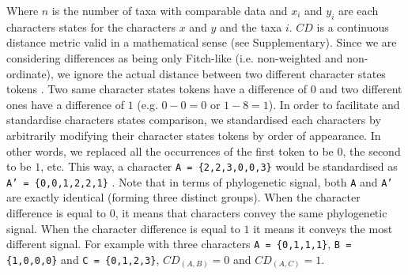 \documentclass[12pt,letterpaper]{article}
\begin{document}
\noindent Where $n$ is the number of taxa with comparable data and $x_i$ and $y_i$ are each characters states for the characters $x$ and $y$ and the taxa $i$.
$CD$ is a continuous distance metric valid in a mathematical sense (see Supplementary).
Since we are considering differences as being only Fitch-like (i.e. non-weighted and non-ordinate), we ignore the actual distance between two different character states tokens \citep[i.e. a Gower distance;][]{GowerDist}.
Two same character states tokens have a difference of $0$ and two different ones have a difference of $1$ (e.g. $0 - 0 = 0$ or $1 - 8 = 1$).
In order to facilitate and standardise characters states comparison, we standardised each characters by arbitrarily modifying their character states tokens by order of appearance.
In other words, we replaced all the occurrences of the first token to be $0$, the second to be $1$, etc.
This way, a character \texttt{A = \{2,2,3,0,0,3\}} would be standardised as \texttt{A' = \{0,0,1,2,2,1\}} \citep[following the \textit{xyz} notation in][p.13]{felsenstein2004inferring}.
Note that in terms of phylogenetic signal, both \texttt{A} and \texttt{A'} are exactly identical (forming three distinct groups).
When the character difference is equal to $0$, it means that characters convey the same phylogenetic signal.
When the character difference is equal to $1$ it means it conveys the most different signal.
For example with three characters \texttt{A = \{0,1,1,1\}}, \texttt{B = \{1,0,0,0\}} and \texttt{C = \{0,1,2,3\}}, $CD_{(A,B)} = 0$ and $CD_{(A,C)} = 1$.
\end{document}
